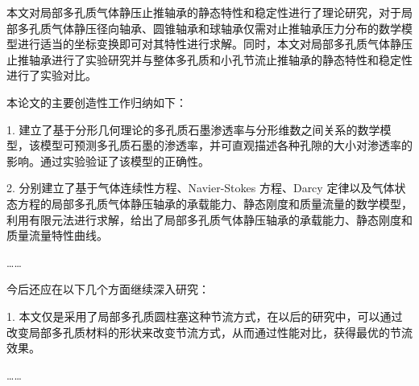 
\begin{conclusions}
本文对局部多孔质气体静压止推轴承的静态特性和稳定性进行了理论研究，对于局部多孔质气体静压径向轴承、圆锥轴承和球轴承仅需对止推轴承压力分布的数学模型进行适当的坐标变换即可对其特性进行求解。同时，本文对局部多孔质气体静压止推轴承进行了实验研究并与整体多孔质和小孔节流止推轴承的静态特性和稳定性进行了实验对比。

本论文的主要创造性工作归纳如下：

1. 建立了基于分形几何理论的多孔质石墨渗透率与分形维数之间关系的数学模型，该模型可预测多孔质石墨的渗透率，并可直观描述各种孔隙的大小对渗透率的影响。通过实验验证了该模型的正确性。

2. 分别建立了基于气体连续性方程、Navier-Stokes 方程、Darcy 定律以及气体状态方程的局部多孔质气体静压轴承的承载能力、静态刚度和质量流量的数学模型，利用有限元法进行求解，给出了局部多孔质气体静压轴承的承载能力、静态刚度和质量流量特性曲线。

……

今后还应在以下几个方面继续深入研究：

1. 本文仅是采用了局部多孔质圆柱塞这种节流方式，在以后的研究中，可以通过改变局部多孔质材料的形状来改变节流方式，从而通过性能对比，获得最优的节流效果。

……
\end{conclusions}

